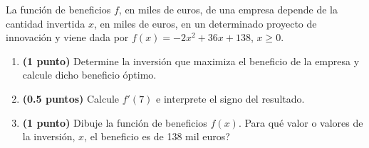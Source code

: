 
La función de beneficios $f$, en miles de euros, de una empresa depende de la cantidad invertida $x$, en miles de euros, en un determinado proyecto de innovación y viene dada por $f(x)=-2x^2+36x+138$, $x\geq0$.
\begin{enumerate}[label=\alph*)]
\item \textbf{(1 punto)} Determine la inversión que maximiza el beneficio de la empresa y calcule dicho beneficio óptimo.
\item \textbf{(0.5 puntos)} Calcule $f'(7)$ e interprete el signo del resultado.
\item \textbf{(1 punto)} Dibuje la función de beneficios $f(x)$. \textquestiondown{}Para qué valor o valores de la inversión, $x$, el beneficio es de 138 mil euros?
\end{enumerate}
